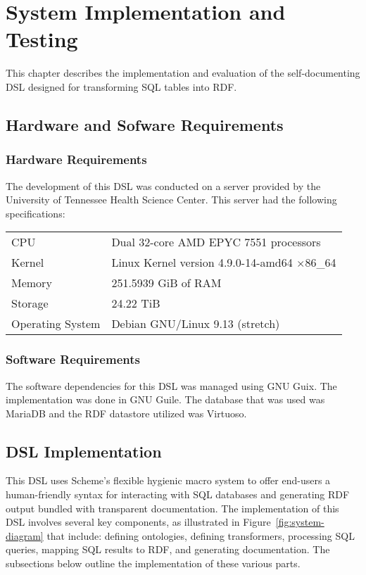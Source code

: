\chapter{System Implementation and Testing}

This chapter describes the implementation and evaluation of the self-documenting DSL designed for transforming SQL tables into RDF\@.

\section{Hardware and Sofware Requirements}

\subsection{Hardware Requirements}

The development of this DSL was conducted on a server provided by the University of Tennessee Health Science Center.  This server had the following specifications:

\begin{center}
\begin{tabular}{ll}
CPU & Dual 32-core AMD EPYC 7551 processors\\
Kernel & Linux Kernel version 4.9.0{-}14{-}amd64 $\times$86\_64\\
Memory & 251.5939 GiB of RAM\\
Storage & 24.22 TiB\\
Operating System & Debian GNU/Linux 9.13 (stretch)\\
\end{tabular}
\end{center}

\subsection{Software Requirements}

The software dependencies for this DSL was managed using GNU Guix.  The implementation was done in GNU Guile.  The database that was used was MariaDB and the RDF datastore utilized was Virtuoso.

\section{DSL Implementation}

This DSL uses Scheme's flexible hygienic macro system to offer end-users a human-friendly syntax for interacting with SQL databases and generating RDF output bundled with transparent documentation.  The implementation of this DSL involves several key components, as illustrated in Figure~\ref{fig:system-diagram} that include: defining ontologies, defining transformers, processing SQL queries, mapping SQL results to RDF, and generating documentation.  The subsections below outline the implementation of these various parts.

